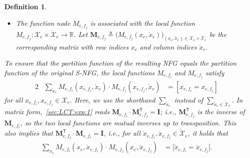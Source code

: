 \documentclass[journal]{IEEEtran}
\newcommand{\add}[1]{{\color{black}#1}}
\newtheorem{definition}[theorem]{Definition}
\newcommand{\vect}[1]{ \bm{#1} }
\newcommand{\set}[1]{\mathcal{#1}}
\newcommand{\sR}{\mathbb{R}}
\newcommand{\tran}{\mathsf{T}}
\newcommand{\xe}{ x_{e} }
\newcommand{\defeq}{ \triangleq }
\newcommand{\matr}[1]{\vect{#1}}
\newcommand{\LCTset}[1]{\mathring{\mathcal{#1}}}
\newcommand{\LCT}[1]{ \mathring{#1} }
\newcommand{\efi}{ e,f_i }
\newcommand{\efj}{ e,f_j }
\newcommand{\LCTsetxe}{ \LCTset{X}_{e} }
\newcommand*{\ie}{\textit{i.e.}}
\begin{document}
\begin{definition}
\begin{enumerate}
\begin{itemize}
\begin{itemize}
                    \item The function node $M_{\efj}$ is associated with the local function
                          $M_{\efj}: \set{X}_e \times \LCTsetxe \to \sR$.
                          Let $ \matr{M}_{\efj} \defeq \bigl( M_{\efj}(\xe, \LCT{x}_e) \bigr)_{\!
                              (\xe, \LCT{x}_e) \in \set{X}_e \times \LCTsetxe} $ be the corresponding matrix
                          with row indices $ \xe $ and column indices $ \LCT{x}_e $.

                  \end{itemize}
                  \add{To ensure that the partition function of the resulting NFG equals the}
                  partition function of the original S-NFG, the local functions $M_{\efi}$
                  and $M_{\efj}$ satisfy
                  \begin{alignat}{2}
                     & \sum_{\LCT{x}_e}
                    M_{\efi}(x_{\efi}, \LCT{x}_e)
                    \cdot
                    M_{\efj}(x_{\efj}, \LCT{x}_e)
                     & = [x_{\efi} \! = \!  x_{\efj}]
                    \label{sec:LCT:exp:1}
                  \end{alignat}
                  for all $x_{e,f_i}, x_{e,f_{j}} \in \set{X}_e.$ \add{Here,
                    we use the shorthand $ \sum_{\LCT{x}_e} $ instead of
                    $ \sum_{\LCT{x}_e \in \LCTsetxe} $}.  \add{In matrix
                    form,~\eqref{sec:LCT:exp:1} reads
                    $ \matr{M}_{\efi} \cdot \matr{M}_{\efj}^{\tran} = \matr{I}
                    $; \ie, $ \matr{M}_{\efj}^{\tran} $ is the inverse of
                    $ \matr{M}_{\efi} $, so the two local functions are mutual
                    inverses up to transposition.} \add{This also implies that
                    $\matr{M}_{\efj}^{\tran} \cdot \matr{M}_{\efi} =
                      \matr{I}$, \ie, for all
                    $\LCT{x}_{e,f_{i}}, \LCT{x}_{e,f_{j}} \in \LCTsetxe$, it
                    holds that}
                  \begin{align}
                    \sum_{x_e}
                    M_{\efi}(\xe, \LCT{x}_{e,f_{i}})
                    \cdot
                    M_{\efj}(\xe, \LCT{x}_{e,f_{j}})
                     & = \bigl[ \LCT{x}_{e,f_{i}} \! = \!  \LCT{x}_{e,f_{j}} \bigr].
                    \label{sec:LCT:exp:2}
                  \end{align}


\end{itemize}
\end{enumerate}
\end{definition}
\end{document}
